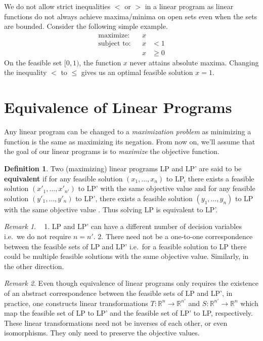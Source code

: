 \documentclass[
]{book}
\theoremstyle{definition}
\newtheorem{definition}{Definition}[chapter]
\theoremstyle{definition}
\theoremstyle{definition}
\theoremstyle{definition}
\theoremstyle{remark}
\newtheorem*{remark}{Remark}
\begin{document}
We do not allow strict inequalities \(<\) or \(>\) in a linear program as linear functions do not always achieve maxima/minima on open sets even when the sets are bounded. Consider the following simple example.
\begin{align*}
  \mbox{maximize:} && x \\
  \mbox{subject to:} 
  && x &< 1 \\
  && x &\ge 0
\end{align*}
On the feasible set \([0, 1)\), the function \(x\) never attains absolute maxima.
Changing the inequality \(<\) to \(\leq\) gives us an optimal feasible solution \(x = 1\).

\hypertarget{equivalence-of-linear-programs}{%
\section{Equivalence of Linear Programs}\label{equivalence-of-linear-programs}}

Any linear program can be changed to a \emph{maximization problem} as minimizing a function is the same as maximizing its negation. From now on, we'll assume that the goal of our linear programs is to \emph{maximize} the objective function.

\begin{definition}
Two (maximizing) linear programs LP and LP' are said to be \textbf{equivalent} if for any feasible solution \((x_1, \dots, x_n)\) to LP, there exists a feasible solution \((x'_1, \dots, x'_{n'})\) to LP' with the same objective value and for any feasible solution \((y'_1, \dots, y'_n)\) to LP', there exists a feasible solution \((y_1, \dots, y_{n})\) to LP with the same objective value . Thus solving LP is equivalent to LP'.
\end{definition}

\begin{remark}
~
1. LP and LP' can have a different number of decision variables i.e.~we do not require \(n = n'.\)
2. There need not be a one-to-one correspondence between the feasible sets of LP and LP' i.e.~for a feasible solution to LP there could be multiple feasible solutions with the same objective value. Similarly, in the other direction.
\end{remark}

\begin{remark}
Even though equivalence of linear programs only requires the existence of an abstract correspondence between the feasible sets of LP and LP', in practice, one constructs linear transformations \(T: \mathbb{R}^n \to \mathbb{R}^{n'}\) and \(S: \mathbb{R}^{n'} \to \mathbb{R}^{n}\) which map the feasible set of LP to LP' and the feasible set of LP' to LP, respectively. These linear transformations need not be inverses of each other, or even isomorphisms. They only need to preserve the objective values.
\end{remark}
\end{document}
